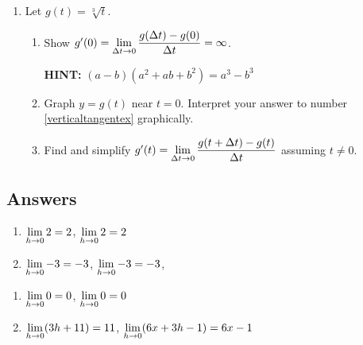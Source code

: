 \begin{enumerate}
\setcounter{enumi}{\value{HW}}

\item Let  $g(t) = \sqrt[3]{t}$.  

\begin{enumerate}

\item\label{verticaltangentex} Show $g'(0) = \displaystyle{\lim_{\Delta t \rightarrow 0} \dfrac{g(\Delta t) - g(0)}{\Delta t} = \infty}$.  

\smallskip

\textbf{HINT:}  $(a-b)\left(a^2+ab+b^2\right) = a^3 - b^3$ 
        
\smallskip
        
\item  Graph $y = g(t)$ near $t=0$.  Interpret your answer to number \ref{verticaltangentex} graphically.

\smallskip

\item  Find and simplify  $g'(t) =  \displaystyle{\lim_{\Delta t \rightarrow 0} \dfrac{g(t+\Delta t) - g(t)}{\Delta t}}$ assuming $t \neq 0$.

\end{enumerate}

\setcounter{HW}{\value{enumi}}
\end{enumerate}

\newpage

\subsection{Answers}


\begin{enumerate}

\item $\displaystyle{\lim_{h \rightarrow 0} 2 = 2}$, $\displaystyle{\lim_{h \rightarrow 0} 2 = 2}$
\item $\displaystyle{\lim_{h \rightarrow 0} -3 = -3}$, $\displaystyle{\lim_{h \rightarrow 0} -3 = -3}$,

\setcounter{HW}{\value{enumi}}
\end{enumerate}

\begin{enumerate}
\setcounter{enumi}{\value{HW}}

\item $\displaystyle{\lim_{h \rightarrow 0} 0 = 0}$,  $\displaystyle{\lim_{h \rightarrow 0} 0 = 0}$
\item  $\displaystyle{\lim_{h \rightarrow 0} (3h+11)= 11}$,   $\displaystyle{\lim_{h \rightarrow 0} (6x+3h-1)= 6x-1}$

\setcounter{HW}{\value{enumi}}
\end{enumerate}

